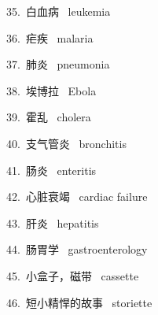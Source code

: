 \documentclass[a4paper, 12pt]{article}
\begin{document}
\begin{multicols}{2}
\begin{flushleft}
35.\ 白血病 \ leukemia
\end{flushleft}

\begin{flushleft}
36.\ 疟疾 \ malaria
\end{flushleft}
\end{multicols}

\begin{multicols}{2}
\begin{flushleft}
37.\ 肺炎 \ pneumonia
\end{flushleft}

\begin{flushleft}
38.\ 埃博拉 \ Ebola
\end{flushleft}
\end{multicols}

\begin{multicols}{2}
\begin{flushleft}
39.\ 霍乱 \ cholera
\end{flushleft}

\begin{flushleft}
40.\ 支气管炎 \ bronchitis
\end{flushleft}
\end{multicols}

\begin{multicols}{2}
\begin{flushleft}
41.\ 肠炎 \ enteritis
\end{flushleft}

\begin{flushleft}
42.\ 心脏衰竭 \ cardiac failure
\end{flushleft}
\end{multicols}

\begin{multicols}{2}
\begin{flushleft}
43.\ 肝炎 \ hepatitis
\end{flushleft}

\begin{flushleft}
44.\ 肠胃学 \ gastroenterology
\end{flushleft}
\end{multicols}

\begin{multicols}{2}
\begin{flushleft}
45.\ 小盒子，磁带 \ cassette
\end{flushleft}

\begin{flushleft}
46.\ 短小精悍的故事 \ storiette
\end{flushleft}
\end{multicols}
\end{document}
